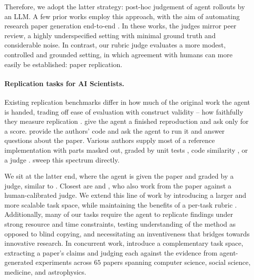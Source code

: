 \documentclass[garamond,a4paper]{inherent}
\begin{document}
Therefore, we adopt the latter strategy: post-hoc judgement of agent rollouts by an LLM.
A few prior works employ this approach, with the aim of automating research paper generation end-to-end \citep{sakanaaiscientist,cycleresearcher,schmidgall2025agent}.
In these works, the judges mirror peer review, a highly underspecified setting with minimal ground truth and considerable noise.
In contrast, our rubric judge evaluates a more modest, controlled and grounded setting, in which agreement with humans can more easily be established: paper replication.

\paragraph{Replication tasks for AI Scientists.}
Existing replication benchmarks differ in how much of the original work the agent is handed, trading off ease of evaluation with construct validity -- how faithfully they measure replication \citep{construct-validity, construct-validity-in-llms}.
\citet{repro-bench} give the agent a finished reproduction and ask only for a score.
\citet{socsci-repro-bench, core-bench} provide the authors' code and ask the agent to run it and answer questions about the paper.
Various authors supply most of a reference implementation with parts masked out, graded by unit tests \citep{researchcodebench, exp-bench}, code similarity \citep{scireplicate-bench}, or a judge \citep{lmr-bench}.
\citet{from-reproduction-to-replication} sweep this spectrum directly.

We sit at the latter end, where the agent is given the paper and graded by a judge, similar to \cite{paperbench, mlreplicate, prbench, automat}.
Closest are \citet{autoreproduce} and \citet{paper2code}, who also work from the paper against a human-calibrated judge.
We extend this line of work by introducing a larger and more scalable task space, while maintaining the benefits of a per-task rubric \citep{cook2024ticking,goel2025training,gunjal2025rubrics,viswanathan2026checklists,shen2026rethinking,hong2026can}.
Additionally, many of our tasks require the agent to replicate findings under strong resource and time constraints, testing understanding of the method as opposed to blind copying, and necessitating an inventiveness that bridges towards innovative research. 
In concurrent work, \citet{veritas} introduce a complementary task space, extracting a paper's claims and judging each against the evidence from agent-generated experiments across $65$ papers spanning computer science, social science, medicine, and astrophysics.
\end{document}
